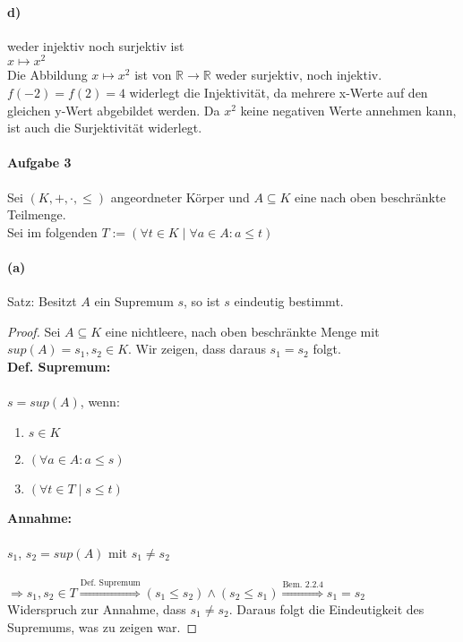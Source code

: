 \documentclass[12pt, letterpaper]{article}
\begin{document}
\paragraph{d)}
\noindent weder injektiv noch surjektiv ist\\

\noindent $x \mapsto x^2$\\

\noindent Die Abbildung $x \mapsto x^2$ ist von $\mathbb{R} \to \mathbb{R}$ weder surjektiv, noch injektiv. $f(-2) = f(2) = 4$ widerlegt die Injektivität, da mehrere x-Werte auf den gleichen y-Wert abgebildet werden. Da $x^2$ keine negativen Werte annehmen kann, ist auch die Surjektivität widerlegt.\\

\paragraph{Aufgabe 3}

Sei $(K, +, \cdot, \leq)$ angeordneter Körper und $A \subseteq K$ eine nach oben beschränkte Teilmenge.\\
\noindent Sei im folgenden $T := (\forall t \in K \mid \forall a \in A: a \leq t)$

\paragraph{(a)} Satz: Besitzt $A$ ein Supremum $s$, so ist $s$ eindeutig bestimmt.

\begin{proof}

\noindent Sei $A \subseteq K$ eine nichtleere, nach oben beschränkte Menge mit $sup(A) = s_1, s_2 \in K$. Wir zeigen, dass daraus $s_1 = s_2$ folgt.\\

\noindent\textbf{Def. Supremum:}\\ \\
\noindent$s = sup(A)$, wenn:
\begin{enumerate}
    \item $s \in K$
    \item $(\forall a \in A: a \leq s)$
    \item $(\forall t \in T \mid s \leq t)$
\end{enumerate}
\noindent\textbf{Annahme:}\\ \\
\noindent $s_1$, $s_2 = sup(A)$ mit $s_1 \neq s_2$\\ \\
\noindent $\Rightarrow s_1, s_2 \in T \overset{\text{Def. Supremum}}{\Rightarrow} (s_1 \leq s_2) \land (s_2 \leq s_1) \overset{\text{Bem. 2.2.4}}{\Rightarrow} s_1 = s_2$\\

\noindent Widerspruch zur Annahme, dass $s_1 \neq s_2$. Daraus folgt die Eindeutigkeit des Supremums, was zu zeigen war.

\end{proof}
\end{document}

